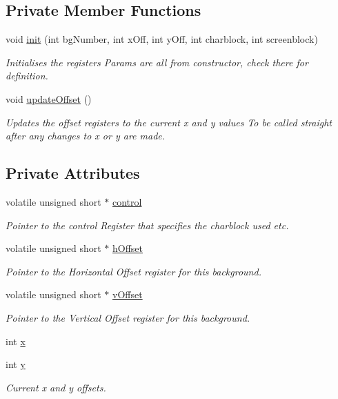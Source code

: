 \subsection*{Private Member Functions}
\begin{DoxyCompactItemize}
\item 
void \hyperlink{class_g_b_a_tilemap_afc7eca23b7e262ac23465e68c9a9d23d}{init} (int bg\-Number, int x\-Off, int y\-Off, int charblock, int screenblock)
\begin{DoxyCompactList}\small\item\em Initialises the registers Params are all from constructor, check there for definition. \end{DoxyCompactList}\item 
void \hyperlink{class_g_b_a_tilemap_a0af625c6abcfb8e709f9719812ad0f46}{update\-Offset} ()
\begin{DoxyCompactList}\small\item\em Updates the offset registers to the current x and y values To be called straight after any changes to x or y are made. \end{DoxyCompactList}\end{DoxyCompactItemize}
\subsection*{Private Attributes}
\begin{DoxyCompactItemize}
\item 
volatile unsigned short $\ast$ \hyperlink{class_g_b_a_tilemap_a6582976ee722879c1f1c8424fedfa6dc}{control}
\begin{DoxyCompactList}\small\item\em Pointer to the control Register that specifies the charblock used etc. \end{DoxyCompactList}\item 
volatile unsigned short $\ast$ \hyperlink{class_g_b_a_tilemap_a4e59c0ad01395ffaa5b3e6ce978c41cf}{h\-Offset}
\begin{DoxyCompactList}\small\item\em Pointer to the Horizontal Offset register for this background. \end{DoxyCompactList}\item 
volatile unsigned short $\ast$ \hyperlink{class_g_b_a_tilemap_a1adc8cd141d27745c504a0f04ad107a1}{v\-Offset}
\begin{DoxyCompactList}\small\item\em Pointer to the Vertical Offset register for this background. \end{DoxyCompactList}\item 
int \hyperlink{class_g_b_a_tilemap_ae83d6511d021d12d55c9fa4613113998}{x}
\item 
int \hyperlink{class_g_b_a_tilemap_aa18154630ab0e96309fab9e7226a02a0}{y}
\begin{DoxyCompactList}\small\item\em Current x and y offsets. \end{DoxyCompactList}\end{DoxyCompactItemize}


